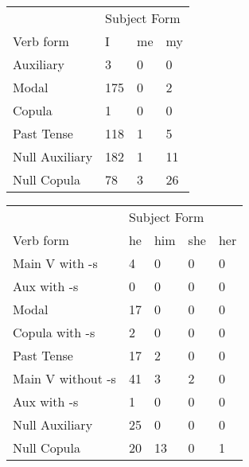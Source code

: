 \begin{table}[]
\begin{minipage}{0.5\textwidth}
    \centering
    \begin{tabular}{@{}llll@{}}
        \toprule
            &\multicolumn{3}{l}{Subject Form}\\
            \cline{2-4}
        Verb form & I & me & my \\
        \midrule
        Auxiliary & 3 & 0 & 0 \\
        Modal & 175 & 0 & 2 \\
        Copula & 1 & 0 & 0 \\
        Past Tense & 118 & 1 & 5 \\
        \hline
        Null Auxiliary & 182 & 1 & 11 \\
        Null Copula & 78 & 3 & 26 \\
        \bottomrule
    \end{tabular}
\end{minipage}
\begin{minipage}{0.5\textwidth}
    \centering
    \begin{tabular}{@{}lllll@{}}
        \toprule
            &\multicolumn{4}{l}{Subject Form}\\
            \cline{2-5}
        Verb form & he & him & she & her \\
        \midrule
        Main V with -s & 4 & 0 & 0 & 0 \\
        Aux with -s & 0 & 0 & 0 & 0 \\
        Modal & 17 & 0 & 0 & 0 \\
        Copula with -s & 2 & 0 & 0 & 0 \\
        Past Tense & 17 & 2 & 0 & 0 \\
        \hline
        Main V without -s & 41 & 3 & 2 & 0 \\
        Aux with -s & 1 & 0 & 0 & 0 \\
        Null Auxiliary & 25 & 0 & 0 & 0 \\
        Null Copula & 20 & 13 & 0 & 1 \\
        \bottomrule
    \end{tabular}
    \end{minipage}
\end{table}